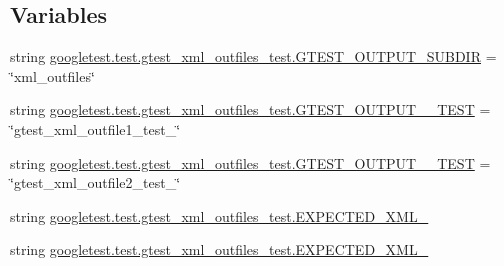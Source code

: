 \subsection*{Variables}
\begin{DoxyCompactItemize}
\item 
string \mbox{\hyperlink{namespacegoogletest_1_1test_1_1gtest__xml__outfiles__test_a172fced6c0c1aac2af0b6ccddf5bc0c1}{googletest.\+test.\+gtest\+\_\+xml\+\_\+outfiles\+\_\+test.\+G\+T\+E\+S\+T\+\_\+\+O\+U\+T\+P\+U\+T\+\_\+\+S\+U\+B\+D\+IR}} = \char`\"{}xml\+\_\+outfiles\char`\"{}
\item 
string \mbox{\hyperlink{namespacegoogletest_1_1test_1_1gtest__xml__outfiles__test_a87913dee1f7d82420f0f4bb925573c30}{googletest.\+test.\+gtest\+\_\+xml\+\_\+outfiles\+\_\+test.\+G\+T\+E\+S\+T\+\_\+\+O\+U\+T\+P\+U\+T\+\_\+\_\+\+T\+E\+ST}} = \char`\"{}gtest\+\_\+xml\+\_\+outfile1\+\_\+test\+\_\+\char`\"{}
\item 
string \mbox{\hyperlink{namespacegoogletest_1_1test_1_1gtest__xml__outfiles__test_ae451c35e618e6d1740e852337ea86f58}{googletest.\+test.\+gtest\+\_\+xml\+\_\+outfiles\+\_\+test.\+G\+T\+E\+S\+T\+\_\+\+O\+U\+T\+P\+U\+T\+\_\+\_\+\+T\+E\+ST}} = \char`\"{}gtest\+\_\+xml\+\_\+outfile2\+\_\+test\+\_\+\char`\"{}
\item 
string \mbox{\hyperlink{namespacegoogletest_1_1test_1_1gtest__xml__outfiles__test_aa64a4f1e3b4abc2e6b82f28c2f967041}{googletest.\+test.\+gtest\+\_\+xml\+\_\+outfiles\+\_\+test.\+E\+X\+P\+E\+C\+T\+E\+D\+\_\+\+X\+M\+L\+\_}}
\item 
string \mbox{\hyperlink{namespacegoogletest_1_1test_1_1gtest__xml__outfiles__test_a71714c83d88e6023fb53cbd55d27182b}{googletest.\+test.\+gtest\+\_\+xml\+\_\+outfiles\+\_\+test.\+E\+X\+P\+E\+C\+T\+E\+D\+\_\+\+X\+M\+L\+\_}}
\end{DoxyCompactItemize}
